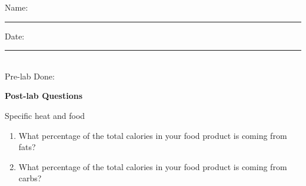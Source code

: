 \documentclass[main.tex]{subfiles}
\begin{document}
\newpage
\begin{multicols}{2}
\begin{tcolorbox}[enhanced jigsaw,breakable,size=title,
colback=mybrown!05,colframe=black,fonttitle=\bfseries,
title=STUDENT INFO,pad at break=1mm, break at=15cm/0pt ]
\vspace{0.2cm}
\noindent Name: \rule{5cm}{0.4pt}Date:\rule{1cm}{0.4pt}\\
Pre-lab Done: \quad
\end{tcolorbox}
\end{multicols}
\hfill
\vspace{0.2cm}
\begin{center}
{\large \bfseries 
Post-lab Questions 
\par
\Huge
Specific heat and food
\\[5pt] \par}
\vspace{0.2cm}
\end{center}
\par
\noindent
\uline{  \hfill \normalsize \hfill       }




 
\begin{enumerate}
\item What percentage of the total calories in your food product is coming from fats?
\vspace{2.cm}
\item What percentage of the total calories in your food product is coming from carbs?
\vspace{2.cm}
\end{enumerate}
 
\end{document}
